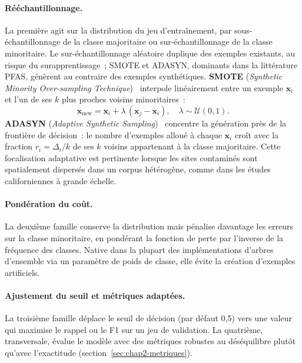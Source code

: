 \paragraph{R\'e\'echantillonnage.}
La premi\`ere agit sur la distribution du jeu d'entra\^inement, par sous-\'echantillonnage de la classe majoritaire ou sur-\'echantillonnage de la classe minoritaire.
Le sur-\'echantillonnage al\'eatoire duplique des exemples existants, au risque du surapprentissage~; SMOTE et ADASYN, dominants dans la litt\'erature PFAS, g\'en\`erent au contraire des exemples synth\'etiques.
\textbf{SMOTE} (\emph{Synthetic Minority Over-sampling Technique})~\cite{chawla2002smote} interpole lin\'eairement entre un exemple $\mathbf{x}_i$ et l'un de ses $k$ plus proches voisins minoritaires~:
\begin{equation}
    \mathbf{x}_{\mathrm{new}} = \mathbf{x}_i + \lambda\,(\mathbf{x}_j - \mathbf{x}_i), \quad \lambda \sim \mathcal{U}(0,1).
    \label{eq:smote}
\end{equation}
\textbf{ADASYN} (\emph{Adaptive Synthetic Sampling})~\cite{he2008adasyn} concentre la g\'en\'eration pr\`es de la fronti\`ere de d\'ecision~: le nombre d'exemples allou\'e \`a chaque $\mathbf{x}_i$ cro\^it avec la fraction $r_i = \Delta_i/k$ de ses $k$ voisins appartenant \`a la classe majoritaire.
Cette focalisation adaptative est pertinente lorsque les sites contamin\'es sont spatialement dispers\'es dans un corpus h\'et\'erog\`ene, comme dans les \'etudes californiennes \`a grande \'echelle.

\paragraph{Pond\'eration du co\^ut.}
La deuxi\`eme famille conserve la distribution mais p\'enalise davantage les erreurs sur la classe minoritaire, en pond\'erant la fonction de perte par l'inverse de la fr\'equence des classes.
Native dans la plupart des impl\'ementations d'arbres d'ensemble via un param\`etre de poids de classe, elle \'evite la cr\'eation d'exemples artificiels.

\paragraph{Ajustement du seuil et m\'etriques adapt\'ees.}
La troisi\`eme famille d\'eplace le seuil de d\'ecision (par d\'efaut 0,5) vers une valeur qui maximise le rappel ou le F1 sur un jeu de validation.
La quatri\`eme, transversale, \'evalue le mod\`ele avec des m\'etriques robustes au d\'es\'equilibre plut\^ot qu'avec l'exactitude (section~\ref{sec:chap2-metriques}).

